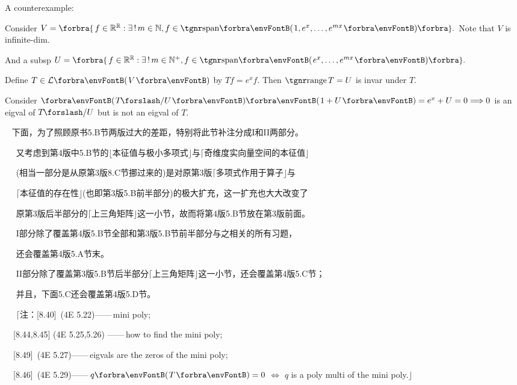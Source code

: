 \documentclass[a4paper, 11pt, UTF8]{article}
\begin{document}
\begin{large}
A counterexample:\par\quad
Consider $V=\Bra{\,f\in\Rbb^{\Rbb}:\exists\,!\,m\in\Nbb,f\in\Span{1,e^x,\dots,e^{mx}}}.$ Note that $V$ is infinite-dim.\par\quad
And a subsp $U=\Bra{\,f\in\Rbb^{\Rbb}:\exists\,!\,m\in\Nbp,f\in\Span{e^x,\dots,e^{mx}}}.$\par\quad
Define $T\in\Lm{V}$ by $Tf=e^x f.$ Then $\range T=U$ is invar under $T.$\par\quad
Consider $\Par{T\mySlash U}\Par{1+U}=e^x+U=0\Longrightarrow 0$ is an eigval of $T\mySlash U$ but is not an eigval of $T$.\par\quad
{}\PfEnd
\SepLine
\ChEnd\pagebreak

\large\vspace{5pt}

{\Comment\,\,\, 下面，为了照顾原书{\tgbf 5.B}节两版过大的差距，特别将此节补注分成{\tgbf I}和{\tgbf II}两部分。\par\qquad\qquad\,\,\,\,\,\,
又考虑到第4版中{\tgbf 5.B}节的$\lfloor$本征值与极小多项式$\rfloor$与$\lceil$奇维度实向量空间的本征值$\rfloor$\par\qquad\qquad\,\,\,\,\,\,
(相当一部分是从原第3版{\tgbf 8.C}节挪过来的)是对原第3版$\lceil$多项式作用于算子$\rfloor$与\par\qquad\qquad\,\,\,\,\,\,
$\lceil$本征值的存在性$\rfloor$(也即第3版{\tgbf 5.B}前半部分)的极大扩充，这一扩充也大大改变了\par\qquad\qquad\,\,\,\,\,\,
原第3版后半部分的$\lceil$上三角矩阵$\rfloor$这一小节，故而将第4版{\tgbf 5.B}节放在第3版前面。{\par}\qquad\qquad\,\,\,\,\,\,
{\tgbf I}部分除了覆盖第4版{\tgbf 5.B}节全部和第3版{\tgbf 5.B}节前半部分与之相关的所有习题，{\Large\par}\qquad\qquad\,\,\,\,\,\,
还会覆盖第4版{\tgbf 5.A}节末。\par\qquad\qquad\,\,\,\,\,\,
{\tgbf II}部分除了覆盖第3版5.B节后半部分$\lceil$上三角矩阵$\rfloor$这一小节，还会覆盖第4版{\tgbf 5.C}节；\par\qquad\qquad\,\,\,\,\,\,
并且，下面{\tgbf 5.C}还会覆盖第4版{\tgbf 5.D}节。\par\qquad\qquad\,\,\,\,\,\,
$\lceil$注：[8.40]\qquad\, \OR (4E 5.22)\qquad ——\,mini poly;\par\qquad\qquad\qquad\quad\,\,\,\,
[8.44,8.45] \OR (4E 5.25,5.26) ——\,how to find the mini poly;\par\qquad\qquad\qquad\quad\,\,\,\,
[8.49]\qquad\, \OR (4E 5.27)\qquad ——\,eigvals are the zeros of the mini poly;\par\qquad\qquad\qquad\quad\,\,\,\,
[8.46]\qquad\, \OR (4E 5.29)\qquad ——\,$q\Par{T} = 0$ $\Leftrightarrow$ $q$ is a poly multi of the mini poly.$\rfloor$
}\par\large



\end{large}
\end{document}
